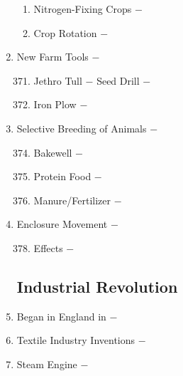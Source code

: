 \documentclass[12pt]{article}
\begin{document}
\begin{enumerate}
\begin{enumerate}[label=\arabic{*}.]
\item Nitrogen-Fixing Crops $-$

\item Crop Rotation $-$

\end{enumerate}
\setcounter{enumi}{369}

\item New Farm Tools $-$ 

\begin{enumerate}[label=\arabic{*}.]
\setcounter{enumii}{370}

\item Jethro Tull $-$ Seed Drill $-$

\item Iron Plow $-$ 

\end{enumerate}
\setcounter{enumi}{372}

\item Selective Breeding of Animals $-$ 

\begin{enumerate}[label=\arabic{*}.]
\setcounter{enumii}{373}

\item Bakewell $-$

\item Protein Food $-$

\item Manure/Fertilizer $-$ 


\end{enumerate}
\setcounter{enumi}{376}

\item Enclosure Movement $-$ 

\begin{enumerate}[label=\arabic{*}.]
\setcounter{enumii}{377}

\item Effects $-$ 

\end{enumerate}
\setcounter{enumi}{378}

\subsection{Industrial Revolution}

\item Began in England in $-$ 

\item Textile Industry Inventions $-$ 

\item Steam Engine $-$ 


\end{enumerate}
\end{document}
